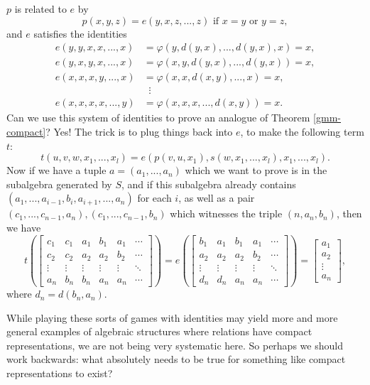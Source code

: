 $p$ is related to $e$ by
\[
p(x,y,z) = e(y,x,z,...,z)\text{ if }x = y\text{ or }y = z,
\]
and $e$ satisfies the identities
\begin{align*}
e(y,y,x,x,...,x) &= \varphi(y,d(y,x),...,d(y,x),x) = x,\\
e(y,x,y,x,...,x) &= \varphi(x, y, d(y,x), ..., d(y,x)) = x,\\
e(x,x,x,y,...,x) &= \varphi(x, x, d(x,y), ..., x) = x,\\
&\;\; \vdots\\
e(x,x,x,x,...,y) &= \varphi(x, x, x, ..., d(x,y)) = x.
\end{align*}
Can we use this system of identities to prove an analogue of Theorem \ref{gmm-compact}? Yes! The trick is to plug things back into $e$, to make the following term $t$:
\[
t(u,v,w,x_1,...,x_l) = e(p(v,u,x_1),s(w,x_1,...,x_l),x_1,...,x_l).
\]
Now if we have a tuple $a = (a_1,...,a_n)$ which we want to prove is in the subalgebra generated by $S$, and if this subalgebra already contains $(a_1,...,a_{i-1},b_i,a_{i+1}, ..., a_n)$ for each $i$, as well as a pair $(c_1, ..., c_{n-1}, a_n), (c_1, ..., c_{n-1}, b_n)$ which witnesses the triple $(n,a_n,b_n)$, then we have
\[
t\left(\begin{bmatrix} c_1 & c_1 & a_1 & b_1 & a_1 & \cdots\\ c_2 & c_2 & a_2 & a_2 & b_2 & \cdots\\ \vdots & \vdots & \vdots & \vdots & \vdots & \ddots\\ a_n & b_n & b_n & a_n & a_n & \cdots\end{bmatrix}\right) = e\left(\begin{bmatrix} b_1 & a_1 & b_1 & a_1 & \cdots\\ a_2 & a_2 & a_2 & b_2 & \cdots\\ \vdots &\vdots & \vdots & \vdots & \ddots\\ d_n & d_n & a_n & a_n & \cdots\end{bmatrix}\right) = \begin{bmatrix} a_1\\ a_2\\ \vdots\\ a_n\end{bmatrix},
\]
where $d_n = d(b_n,a_n)$.

While playing these sorts of games with identities may yield more and more general examples of algebraic structures where relations have compact representations, we are not being very systematic here. So perhaps we should work backwards: what absolutely needs to be true for something like compact representations to exist?

